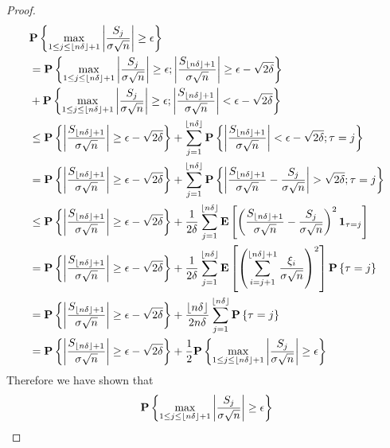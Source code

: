\begin{proof}
\begin{align*}
&\textbf{P}\left \{\max_{1 \leq j \leq \left \lfloor n\delta \right \rfloor + 1} \left \vert \frac{S_j}{\sigma \sqrt{n}} \right \vert \geq \epsilon
   \right \} \\
&=\textbf{P}\left \{\max_{1 \leq j \leq \left \lfloor n\delta \right \rfloor + 1}
  \left \vert \frac{S_j}{\sigma \sqrt{n}} \right \vert \geq \epsilon; 
\left \vert \frac{S_{\left \lfloor n\delta \right \rfloor+1}}{\sigma \sqrt{n}} \right \vert  \geq \epsilon -
\sqrt{2\delta} \right \} \\
&+ \textbf{P}\left \{\max_{1 \leq j \leq \left \lfloor n\delta \right \rfloor + 1}
  \left \vert \frac{S_j}{\sigma \sqrt{n}} \right \vert \geq \epsilon; 
\left \vert \frac{S_{\left \lfloor n\delta \right \rfloor+1}}{\sigma \sqrt{n}} \right \vert < 
  \epsilon - \sqrt{2\delta} \right \} \\
&\leq \textbf{P}\left \{\left \vert \frac{S_{\left \lfloor n\delta \right \rfloor+1}}{\sigma \sqrt{n}} \right \vert
  \geq \epsilon - \sqrt{2\delta} \right \} + 
\sum_{j=1}^{\left \lfloor n\delta \right \rfloor}
\textbf{P}\left \{\left \vert \frac{S_{\left \lfloor n\delta \right \rfloor+1}}{\sigma \sqrt{n}} \right \vert <
  \epsilon - \sqrt{2\delta}; \tau = j \right \} \\
&= \textbf{P}\left \{\left \vert \frac{S_{\left \lfloor n\delta \right \rfloor+1}}{\sigma \sqrt{n}} \right \vert
  \geq \epsilon - \sqrt{2\delta} \right \} + 
\sum_{j=1}^{\left \lfloor n\delta \right \rfloor}
\textbf{P}\left \{\left \vert \frac{S_{\left \lfloor n\delta \right \rfloor+1}}{\sigma \sqrt{n}} -
    \frac{S_j}{\sigma \sqrt{n}} \right \vert > \sqrt{2\delta}; \tau = j \right \} \\
&\leq \textbf{P}\left \{\left \vert \frac{S_{\left \lfloor n\delta \right \rfloor+1}}{\sigma \sqrt{n}} \right \vert
  \geq \epsilon - \sqrt{2\delta} \right \} + 
\frac{1}{2\delta}\sum_{j=1}^{\left \lfloor n\delta \right \rfloor}
\textbf{E}\left[\left(
    \frac{S_{\left \lfloor n\delta \right \rfloor+1}}{\sigma \sqrt{n}} - \frac{S_j}{\sigma
      \sqrt{n}} \right)^2 \textbf{1}_{\tau = j}\right] \\
&= \textbf{P}\left \{\left \vert \frac{S_{\left \lfloor n\delta \right \rfloor+1}}{\sigma \sqrt{n}} \right \vert
  \geq \epsilon - \sqrt{2\delta} \right \} + 
\frac{1}{2\delta}\sum_{j=1}^{\left \lfloor n\delta \right \rfloor}
\textbf{E}\left[\left( \sum_{i=j+1}^{\left \lfloor n\delta \right \rfloor+1}
    \frac{\xi_i}{\sigma\sqrt{n}} \right)^2 \right] \textbf{P}\left \{\tau = j \right \} \\
&= \textbf{P}\left \{\left \vert \frac{S_{\left \lfloor n\delta \right \rfloor+1}}{\sigma \sqrt{n}} \right \vert
  \geq \epsilon - \sqrt{2\delta} \right \} + 
\frac{\left \lfloor n\delta \right \rfloor}{2 n \delta}\sum_{j=1}^{\left \lfloor n\delta \right \rfloor}
\textbf{P}\left \{\tau = j \right \} \\
&= \textbf{P}\left \{\left \vert \frac{S_{\left \lfloor n\delta \right \rfloor+1}}{\sigma \sqrt{n}} \right \vert
  \geq \epsilon - \sqrt{2\delta} \right \} + 
\frac{1}{2}\textbf{P}\left \{\max_{1 \leq j \leq \left \lfloor n\delta \right \rfloor + 1} \left \vert \frac{S_j}{\sigma \sqrt{n}} \right \vert \geq \epsilon \right \}
\end{align*}
Therefore we have shown that 
\begin{align*}
\probability{\max_{1 \leq j \leq \floor{n\delta} + 1} \abs{\frac{S_j}{\sigma \sqrt{n}}} \geq \epsilon}

\end{align*}
\end{proof}
